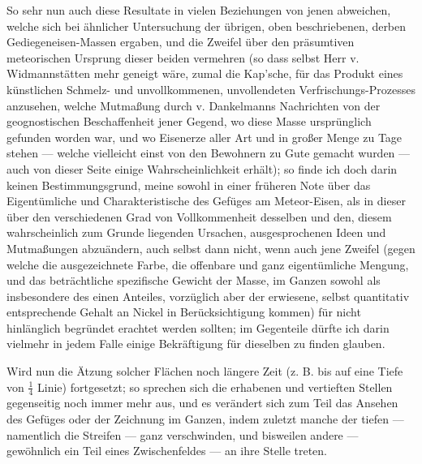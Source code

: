 \documentclass[a4paper, 11pt, oneside, german]{article}
\begin{document}
{So sehr nun auch diese Resultate in vielen Beziehungen von jenen abweichen, welche sich bei ähnlicher Untersuchung der übrigen, oben beschriebenen, derben Gediegeneisen-Massen ergaben, und die Zweifel über den präsumtiven meteorischen Ursprung dieser beiden vermehren (so dass selbst Herr v. Widmannstätten mehr geneigt wäre, zumal die Kap'sche, für das Produkt eines künstlichen Schmelz- und unvollkommenen, unvollendeten Verfrischungs-Prozesses anzusehen, welche Mutmaßung durch v. Dankelmanns Nachrichten von der geognostischen Beschaffenheit jener Gegend, wo diese Masse ursprünglich gefunden worden war, und wo Eisenerze aller Art und in großer Menge zu Tage stehen --- welche vielleicht einst von den Bewohnern zu Gute gemacht wurden --- auch von dieser Seite einige Wahrscheinlichkeit erhält); so finde ich doch darin keinen Bestimmungsgrund, meine sowohl in einer früheren Note über das Eigentümliche und Charakteristische des Gefüges am Meteor-Eisen, als in dieser über den verschiedenen Grad von Vollkommenheit desselben und den, diesem wahrscheinlich zum Grunde liegenden Ursachen, ausgesprochenen Ideen und Mutmaßungen abzuändern, auch selbst dann nicht, wenn auch jene Zweifel (gegen welche die ausgezeichnete Farbe, die offenbare und ganz eigentümliche Mengung, und das beträchtliche spezifische Gewicht der Masse, im Ganzen sowohl als insbesondere des einen Anteiles, vorzüglich aber der erwiesene, selbst quantitativ entsprechende Gehalt an Nickel in Berücksichtigung kommen) für nicht hinlänglich begründet erachtet werden sollten; im Gegenteile dürfte ich darin vielmehr in jedem Falle einige Bekräftigung für dieselben zu finden glauben.}

Wird nun die Ätzung solcher Flächen noch längere Zeit (z. B. bis auf eine Tiefe von $\frac{1}{4}$ Linie) fortgesetzt; so sprechen sich die erhabenen und vertieften Stellen gegenseitig noch immer mehr aus, und es verändert sich zum Teil das Ansehen des Gefüges oder der Zeichnung im Ganzen, indem zuletzt manche der tiefen --- namentlich die Streifen --- ganz verschwinden, und bisweilen andere --- gewöhnlich ein Teil eines Zwischenfeldes --- an ihre Stelle treten.
\end{document}
